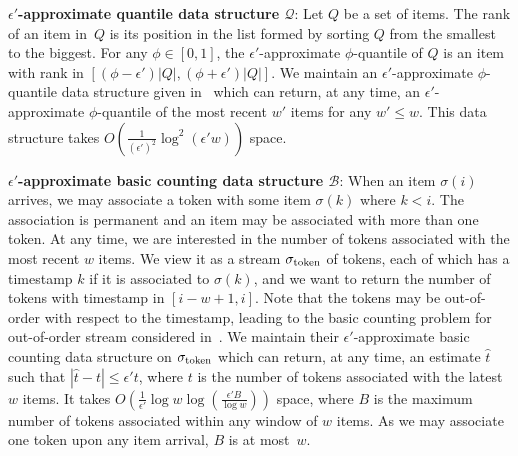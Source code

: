 \documentclass{llncs}
\begin{document}
{\bf $\epsilon'$-approximate quantile data structure
\boldmath $\mathcal{Q}$}:
Let $Q$ be a set of items. The rank of an item in~$Q$
is its position in the list formed by sorting $Q$
from the smallest to the biggest. For any $\phi \in [0,1]$,
the $\epsilon'$-approximate $\phi$-quantile of $Q$
is an item with rank in $[(\phi-\epsilon')|Q|,(\phi+\epsilon')|Q|]$.
We maintain an $\epsilon'$-approximate $\phi$-quantile
data structure given in~\cite{LLX+04} which
can return, at any time, an $\epsilon'$-approximate
$\phi$-quantile of the most recent $w'$ items
for any $w'\le w$.
This data structure takes
$O(\frac{1}{(\epsilon')^2}\log ^2 (\epsilon' w))$ space.

{\bf $\epsilon'$-approximate basic counting data structure \boldmath$\mathcal{B}$}:
When an item $\sigma(i)$ arrives, we may
associate a token with some item $\sigma(k)$
where $k < i$. The association is permanent and
an item may be associated with more than one token.
At any time, we are interested in the number
of tokens associated with the most recent $w$ items.
We view it as a stream $\sigma_{\rm token}$ of tokens,
each of which has a timestamp $k$ if it is associated to $\sigma(k)$,
and we want to return the number of tokens with timestamp in $[i-w+1, i]$.
Note that the tokens may be out-of-order with respect to the timestamp,
leading to the basic counting problem for out-of-order stream
considered in~\cite{CKT08}.
We maintain their $\epsilon'$-approximate basic counting data structure
on $\sigma_{\rm token}$ which can return, at any time, an estimate $\hat t$
such that $| \hat t - t| \le \epsilon' t$, where
$t$ is the number of tokens associated with
the latest $w$ items.
It takes
$O( \frac{1}{\epsilon'} \log w \log(\frac{\epsilon' B}{\log w}))$ space,
where $B$ is the maximum number of tokens associated within
any window of $w$ items.
As we may associate one token upon any
item arrival, $B$ is at most~$w$. 
\end{document}
